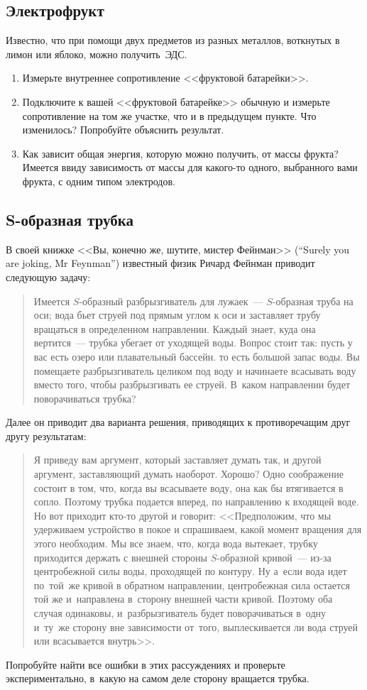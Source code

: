 \documentclass[a4paper,12pt]{article}
\begin{document}
\subsection{Электрофрукт}
Известно, что при помощи двух предметов из разных металлов, воткнутых в лимон или яблоко, можно получить~ЭДС.
\begin{enumerate}
 \item Измерьте внутреннее сопротивление <<фруктовой батарейки>>.

 \item Подключите к вашей  <<фруктовой батарейке>> обычную и измерьте сопротивление на том же участке,
 что и в предыдущем пункте. Что изменилось? Попробуйте объяснить результат.

 \item Как зависит общая энергия, которую можно получить, от массы фрукта? Имеется  ввиду зависимость
 от массы для какого-то одного, выбранного вами фрукта, с одним типом электродов.
\end{enumerate}

\subsection{S-образная трубка}
В своей книжке <<Вы, конечно же, шутите, мистер Фейнман>> (``Surely you are joking, Mr Feynman'')
известный физик Ричард Фейнман приводит следующую задачу:
\begin{quote} Имеется $S$-образный разбрызгиватель для лужаек~--- $S$-образная труба на оси;
вода бьет струей под прямым углом к оси и заставляет трубу вращаться в определенном направлении.
Каждый знает, куда она вертится~--- трубка убегает от уходящей воды. Вопрос стоит так: пусть у вас
есть озеро или плавательный бассейн. то есть большой запас воды. Вы помещаете разбрызгиватель целиком
под воду и начинаете всасывать воду вместо того, чтобы разбрызгивать ее струей. В~каком направлении
будет поворачиваться трубка?
\end{quote}
Далее он приводит два варианта решения, приводящих к противоречащим друг другу результатам:
\begin{quote}
Я приведу вам аргумент, который заставляет думать так, и другой аргумент, заставляющий думать наоборот. Хорошо?
Одно соображение состоит в том, что, когда вы всасываете воду, она как бы втягивается в сопло.
Поэтому трубка подается вперед, по направлению к входящей воде.
Но вот приходит кто-то другой и говорит: <<Предположим, что мы удерживаем устройство в покое и спрашиваем,
какой момент вращения для этого необходим. Мы все знаем, что, когда вода вытекает, трубку приходится
держать с внешней стороны $S$-образной кривой~--- из-за центробежной силы воды, проходящей по контуру.
Ну а~если вода идет по~той~же кривой в обратном направлении, центробежная сила остается той же
и~направлена в~сторону внешней части кривой. Поэтому оба случая одинаковы, и~разбрызгиватель
будет поворачиваться в~одну и~ту~же сторону вне зависимости от~того, выплескивается ли вода
струей или всасывается внутрь>>.
\end{quote}
Попробуйте найти все ошибки в этих рассуждениях и проверьте экспериментально,
в~какую на самом деле сторону вращается трубка.
\end{document}
